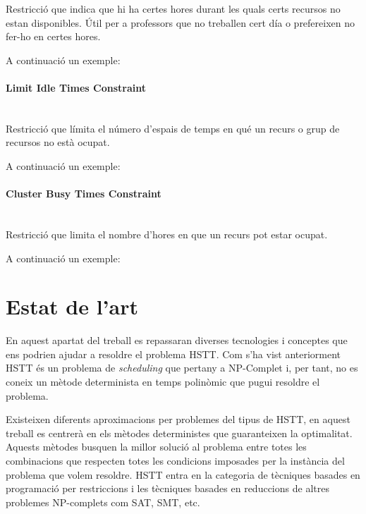\documentclass[11pt,a4paper,twoside]{report}
\begin{document}
  Restricció que indica que hi ha certes hores durant les quals certs recursos no estan disponibles. Útil per a professors que no treballen cert día o prefereixen no fer-ho en certes hores.
  
  A continuació un exemple:

  
  
  \paragraph*{Limit Idle Times Constraint} ~\\

  Restricció que límita el número d'espais de temps en qué un recurs o grup de recursos no està ocupat. 

  A continuació un exemple:

  
  \paragraph*{Cluster Busy Times Constraint} ~\\

  Restricció que limita el nombre d'hores en que un recurs pot estar ocupat.

  A continuació un exemple:

  


  

  \section{Estat de l'art}

  En aquest apartat del treball es repassaran diverses tecnologies i conceptes que ens podrien ajudar a resoldre el problema HSTT. 
  Com s'ha vist anteriorment HSTT és un problema de \textit{scheduling} que pertany a NP-Complet i, per tant, no es coneix un mètode determinista en temps polinòmic que pugui resoldre el problema. 

  Existeixen diferents aproximacions per problemes del tipus de HSTT, en aquest treball es centrerà en els mètodes deterministes que guaranteixen la optimalitat. Aquests mètodes busquen la millor solució al problema entre totes les combinacions 
  que respecten totes les condicions imposades per la instància del problema que volem resoldre. HSTT entra en la categoria de tècniques basades en programació per restriccions i les tècniques basades en reduccions de altres problemes NP-complets com SAT, SMT, etc.
\end{document}
